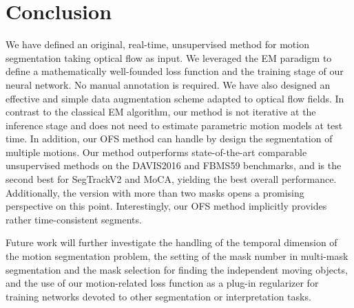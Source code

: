 \documentclass[10pt,twocolumn,letterpaper]{article}
\begin{document}
\vspace{-0.10cm}
\section{Conclusion}
\label{conclusion}

We have defined an original, real-time, unsupervised method for motion segmentation taking optical flow as input. We leveraged the EM paradigm to define a mathematically well-founded loss function and the training stage of our neural network. No manual annotation is required. We have also designed an effective and simple data augmentation scheme adapted to optical flow fields. In contrast to the classical EM algorithm, our method is not iterative at the inference stage and does not need to estimate parametric motion models at test time. In addition, our OFS method can handle by design the segmentation of multiple motions. Our method outperforms state-of-the-art comparable unsupervised methods on the DAVIS2016 and FBMS59 benchmarks, and is the second best for SegTrackV2 and MoCA, yielding the best overall performance. Additionally, the version with more than two masks opens a promising perspective on this point. Interestingly, our OFS method implicitly provides rather time-consistent segments.

Future work will further investigate the handling of the temporal dimension of the motion segmentation problem, {\color{black} the setting of the mask number in multi-mask segmentation and the mask selection for finding the independent moving objects}, and the use of our motion-related loss function as a plug-in regularizer for training networks devoted to other segmentation or interpretation tasks.
\end{document}
